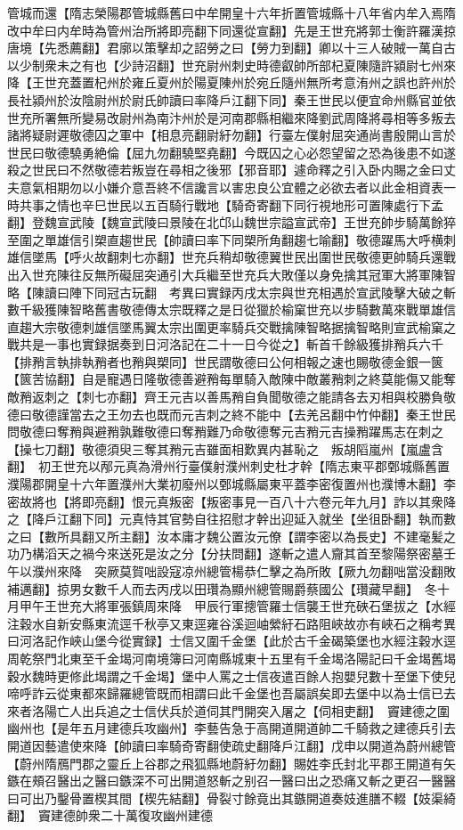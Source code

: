 管城而還【隋志榮陽郡管城縣舊曰中牟開皇十六年折置管城縣十八年省内牟入焉隋改中牟曰内牟時為管州治所將即亮翻下同還從宣翻】先是王世充將郭士衡許羅漢掠唐境【先悉薦翻】君廓以策擊却之詔勞之曰【勞力到翻】卿以十三人破賊一萬自古以少制衆未之有也【少詩沼翻】世充尉州刺史時德叡帥所部杞夏陳隨許潁尉七州來降【王世充蓋置杞州於雍丘夏州於陽夏陳州於宛丘隨州無所考意洧州之誤也許州於長社潁州於汝陰尉州於尉氏帥讀曰率降戶江翻下同】秦王世民以便宜命州縣官並依世充所署無所變易改尉州為南汴州於是河南郡縣相繼來降劉武周降將尋相等多叛去諸將疑尉遲敬德囚之軍中【相息亮翻尉紆勿翻】行臺左僕射屈突通尚書殷開山言於世民曰敬德驍勇絶倫【屈九勿翻驍堅堯翻】今既囚之心必怨望留之恐為後患不如遂殺之世民曰不然敬德若叛豈在尋相之後邪【邪音耶】遽命釋之引入卧内賜之金曰丈夫意氣相期勿以小嫌介意吾終不信讒言以害忠良公宜體之必欲去者以此金相資表一時共事之情也辛巳世民以五百騎行戰地【騎奇寄翻下同行視地形可置陳處行下孟翻】登魏宣武陵【魏宣武陵曰景陵在北邙山魏世宗謚宣武帝】王世充帥步騎萬餘猝至圍之單雄信引槊直趨世民【帥讀曰率下同槊所角翻趨七喻翻】敬德躍馬大呼横刺雄信墜馬【呼火故翻刺七亦翻】世充兵稍却敬德翼世民出圍世民敬德更帥騎兵還戰出入世充陳往反無所礙屈突通引大兵繼至世充兵大敗僅以身免擒其冠軍大將軍陳智略【陳讀曰陣下同冠古玩翻　考異曰實録丙戌太宗與世充相遇於宣武陵擊大破之斬數千級獲陳智略舊書敬德傳太宗既釋之是日從獵於榆窠世充以步騎數萬來戰單雄信直趨大宗敬德刺雄信墜馬翼太宗出圍更率騎兵交戰擒陳智略据擒智略則宣武榆窠之戰共是一事也實録据奏到日河洛記在二十一日今從之】斬首千餘級獲排矟兵六千【排矟言執排執矟者也矟與槊同】世民謂敬德曰公何相報之速也賜敬德金銀一篋【篋苦協翻】自是寵遇日隆敬德善避矟每單騎入敵陳中敵叢矟刺之終莫能傷又能奪敵矟返刺之【刺七亦翻】齊王元吉以善馬矟自負聞敬德之能請各去刃相與校勝負敬德曰敬德謹當去之王勿去也既而元吉刺之終不能中【去羌呂翻中竹仲翻】秦王世民問敬德曰奪矟與避矟孰難敬德曰奪矟難乃命敬德奪元吉矟元吉操矟躍馬志在刺之【操七刀翻】敬德須臾三奪其矟元吉雖面相歎異内甚恥之　叛胡䧟嵐州【嵐盧含翻】　初王世充以邴元真為滑州行臺僕射濮州刺史杜才幹【隋志東平郡鄄城縣舊置濮陽郡開皇十六年置濮州大業初廢州以鄄城縣屬東平蓋李密復置州也濮博木翻】李密故將也【將即亮翻】恨元真叛密【叛密事見一百八十六卷元年九月】詐以其衆降之【降戶江翻下同】元真恃其官勢自往招慰才幹出迎延入就坐【坐徂卧翻】執而數之曰【數所具翻又所主翻】汝本庸才魏公置汝元僚【謂李密以為長史】不建毫髪之功乃構滔天之禍今來送死是汝之分【分扶問翻】遂斬之遣人齎其首至黎陽祭密墓壬午以濮州來降　突厥莫賀咄設寇凉州總管楊恭仁擊之為所敗【厥九勿翻咄當没翻敗補邁翻】掠男女數千人而去丙戌以田瓚為顯州總管賜爵蔡國公【瓚藏早翻】　冬十月甲午王世充大將軍張鎮周來降　甲辰行軍摠管羅士信襲王世充硤石堡拔之【水經注穀水自新安縣東流逕千秋亭又東逕雍谷溪迴岫縈紆石路阻峽故亦有峽石之稱考異曰河洛記作峽山堡今從實録】士信又圍千金堡【此於古千金碣築堡也水經注穀水逕周乾祭門北東至千金堨河南境簿曰河南縣城東十五里有千金堨洛陽記曰千金堨舊堨穀水魏時更修此堨謂之千金堨】堡中人罵之士信夜遣百餘人抱嬰兒數十至堡下使兒啼呼詐云從東都來歸羅總管既而相謂曰此千金堡也吾屬誤矣即去堡中以為士信已去來者洛陽亡人出兵追之士信伏兵於道伺其門開突入屠之【伺相吏翻】　竇建德之圍幽州也【是年五月建德兵攻幽州】李藝告急于高開道開道帥二千騎救之建德兵引去開道因藝遣使來降【帥讀曰率騎奇寄翻使疏史翻降戶江翻】戊申以開道為蔚州總管【蔚州隋鴈門郡之靈丘上谷郡之飛狐縣地蔚紆勿翻】賜姓李氏封北平郡王開道有矢鏃在頰召醫出之醫曰鏃深不可出開道怒斬之别召一醫曰出之恐痛又斬之更召一醫醫曰可出乃鑿骨置楔其間【楔先結翻】骨裂寸餘竟出其鏃開道奏妓進膳不輟【妓渠綺翻】　竇建德帥衆二十萬復攻幽州建德